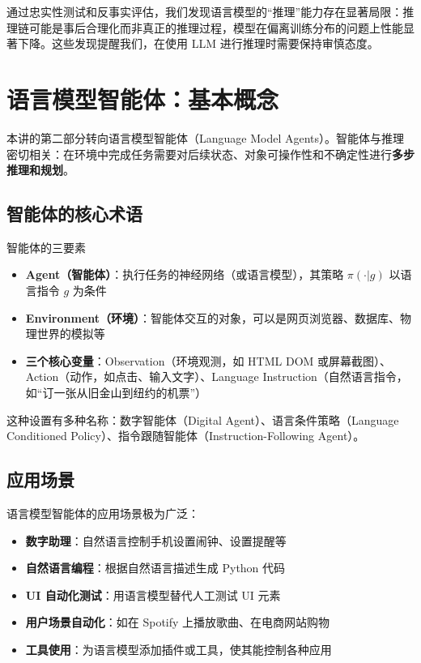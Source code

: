 \documentclass[a4paper]{article}
\begin{document}
通过忠实性测试和反事实评估，我们发现语言模型的``推理''能力存在显著局限：推理链可能是事后合理化而非真正的推理过程，模型在偏离训练分布的问题上性能显著下降。这些发现提醒我们，在使用 LLM 进行推理时需要保持审慎态度。


\section{语言模型智能体：基本概念}

本讲的第二部分转向语言模型智能体（Language Model Agents）。智能体与推理密切相关：在环境中完成任务需要对后续状态、对象可操作性和不确定性进行\textbf{多步推理和规划}。

\subsection{智能体的核心术语}





\begin{importantbox}{智能体的三要素}
\begin{itemize}
    \item \textbf{Agent（智能体）}：执行任务的神经网络（或语言模型），其策略 $\pi(\cdot | g)$ 以语言指令 $g$ 为条件
    \item \textbf{Environment（环境）}：智能体交互的对象，可以是网页浏览器、数据库、物理世界的模拟等
    \item \textbf{三个核心变量}：Observation（环境观测，如 HTML DOM 或屏幕截图）、Action（动作，如点击、输入文字）、Language Instruction（自然语言指令，如``订一张从旧金山到纽约的机票''）
\end{itemize}
\end{importantbox}

这种设置有多种名称：数字智能体（Digital Agent）、语言条件策略（Language Conditioned Policy）、指令跟随智能体（Instruction-Following Agent）。

\subsection{应用场景}

语言模型智能体的应用场景极为广泛：

\begin{itemize}
    \item \textbf{数字助理}：自然语言控制手机设置闹钟、设置提醒等
    \item \textbf{自然语言编程}：根据自然语言描述生成 Python 代码
    \item \textbf{UI 自动化测试}：用语言模型替代人工测试 UI 元素
    \item \textbf{用户场景自动化}：如在 Spotify 上播放歌曲、在电商网站购物
    \item \textbf{工具使用}：为语言模型添加插件或工具，使其能控制各种应用
\end{itemize}
\end{document}
